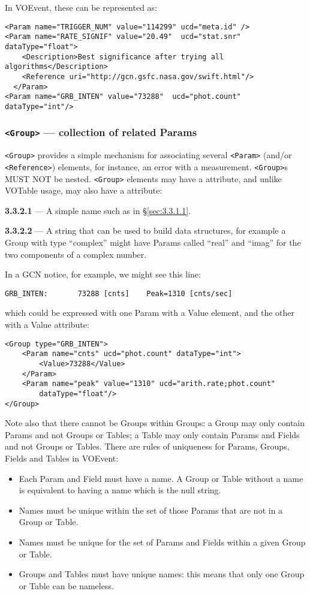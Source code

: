 \documentclass[11pt,a4paper]{ivoa}
\begin{document}
In VOEvent, these can be represented as:
\begin{lstlisting}
<Param name="TRIGGER_NUM" value="114299" ucd="meta.id" />
<Param name="RATE_SIGNIF" value="20.49"  ucd="stat.snr" dataType="float">
    <Description>Best significance after trying all algorithms</Description>
    <Reference uri="http://gcn.gsfc.nasa.gov/swift.html"/>
  </Param>
<Param name="GRB_INTEN" value="73288"  ucd="phot.count" dataType="int"/>
\end{lstlisting}

\subsubsection{\texttt{<Group>} --- collection of related Params}
\label{sec:3.3.2}
\verb|<Group>| provides a simple mechanism for associating several \verb|<Param>|
(and/or \verb|<Reference>|) elements, for instance, an error with a measurement.
\verb|<Group>|s MUST NOT be nested. \verb|<Group>| elements may have a
attribute, and unlike VOTable usage, may also have a  attribute:

\noindent \textbf{3.3.2.1} \label{sec:3.3.2.1} --- A simple name such as
in \S\ref{sec:3.3.1.1}.

\noindent \textbf{3.3.2.2} \label{sec:3.3.2.2} --- A string that can be
used to build data structures, for example a Group with type ``complex'' might
have Params called ``real'' and ``imag'' for the two components of a complex
number.

In a GCN notice, for example, we might see this line:
\begin{lstlisting}
GRB_INTEN:       73288 [cnts]    Peak=1310 [cnts/sec]
\end{lstlisting}
which could be expressed with one Param with a Value element, and the other with
a Value attribute:
\begin{lstlisting}
<Group type="GRB_INTEN">
    <Param name="cnts" ucd="phot.count" dataType="int">
        <Value>73288</Value>
    </Param>
    <Param name="peak" value="1310" ucd="arith.rate;phot.count"
        dataType="float"/>
</Group>
\end{lstlisting}
Note also that there cannot be Groups within Groups: a Group may only contain
Params and not Groups or Tables; a Table may only contain Params and Fields and
not Groups or Tables. There are rules of uniqueness for Params, Groups, Fields
and Tables in VOEvent:
\begin{itemize}
\item Each Param and Field must have a name. A Group or Table without a name is
equivalent to having a name which is the null string.
\item Names must be unique within the set of those Params that are not in a
Group or Table.
\item Names must be unique for the set of Params and Fields within a given Group
or Table.
\item Groups and Tables must have unique names: this means that only one Group
or Table can be nameless.
\end{itemize}
\end{document}
